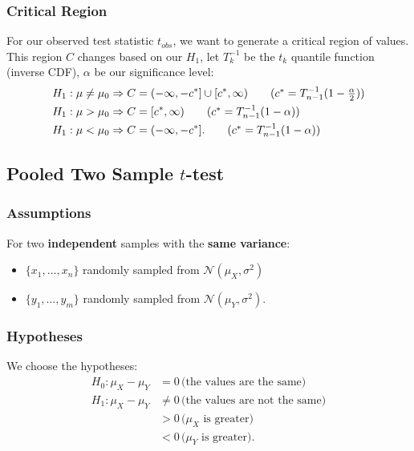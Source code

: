 \documentclass[a4paper, 12pt, twoside]{article}
\begin{document}
\subsubsection{Critical Region}

For our observed test statistic $t_{obs}$, we want to generate a
critical region of values. This region $C$ changes based on our
$H_1$, let $T_k^{-1}$ be the $t_k$ quantile function (inverse CDF),
$\alpha$ be our significance level:
\begin{align*}
    H_1 : \mu \neq \mu_0 & \Rightarrow
    C = (-\infty, -c^*] \cup [c^*, \infty)
    \tag{$ c^* = T^{-1}_{n-1}(1 - \frac{\alpha}{2}) $} \\
    H_1 : \mu > \mu_0    & \Rightarrow
    C = [c^*, \infty)
    \tag{$ c^* = T^{-1}_{n-1}(1 - \alpha) $}           \\
    H_1 : \mu < \mu_0    & \Rightarrow
    C = (-\infty, -c^*].
    \tag{$ c^* = T^{-1}_{n-1}(1 - \alpha) $}
\end{align*}

\newpage

\subsection{Pooled Two Sample $t$-test}

\subsubsection{Assumptions}

For two \textbf{independent} samples with the \textbf{same variance}:
\begin{itemize}
    \item $\{x_1, \ldots, x_n\}$ randomly sampled from
          $\mathcal{N}(\mu_X, \sigma^2)$
    \item $\{y_1, \ldots, y_m\}$
          randomly sampled from $\mathcal{N}(\mu_Y, \sigma^2)$.
\end{itemize}

\subsubsection{Hypotheses}

We choose the hypotheses:
\begin{align*}
    H_0 : \mu_X - \mu_Y & = 0 \, \text{(the values are the same)}        \\
    H_1 : \mu_X - \mu_Y & \neq 0 \, \text{(the values are not the same)} \\
                        & > 0 \, \text{($\mu_X$ is greater)}             \\
                        & < 0 \, \text{($\mu_Y$ is greater)}.
\end{align*}
\end{document}
